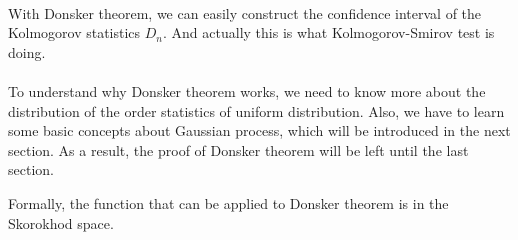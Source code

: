 \documentclass[final_project_1.tex]{subfiles}
\begin{document}
\paragraph{}
With Donsker theorem, we can easily construct the confidence interval of the Kolmogorov statistics $D_n$. And actually this is what Kolmogorov-Smirov test is doing.

\paragraph{}
To understand why Donsker theorem works, we need to know more about the distribution of the order statistics of uniform distribution. Also, we have to learn some basic concepts about Gaussian process, which will be introduced in the next section. As a result, the proof of Donsker theorem will be left until the last section.

\begin{remark}
Formally, the function that can be applied to Donsker theorem is in the Skorokhod space.
\end{remark}
\end{document}
